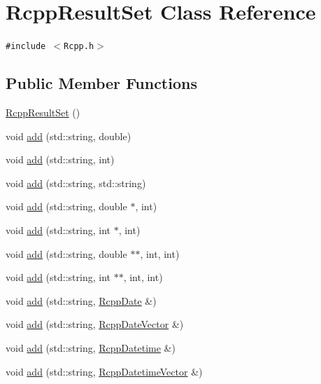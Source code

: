 \hypertarget{classRcppResultSet}{
\section{RcppResultSet Class Reference}
\label{classRcppResultSet}
}
{\tt \#include $<$Rcpp.h$>$}

\subsection*{Public Member Functions}
\begin{CompactItemize}
\item 
\hyperlink{classRcppResultSet_b799c6b9bd730e55d92228203903ba74}{RcppResultSet} ()
\item 
void \hyperlink{classRcppResultSet_7c7da37f18bd352303bf06b7c5233bc4}{add} (std::string, double)
\item 
void \hyperlink{classRcppResultSet_8b7841ff8a52477b0c6a1fb7c03c0fd9}{add} (std::string, int)
\item 
void \hyperlink{classRcppResultSet_2633372ab2f50b269e9e26dd7a489492}{add} (std::string, std::string)
\item 
void \hyperlink{classRcppResultSet_5d06d8a4f0497abc6fad4ea22b4934f9}{add} (std::string, double $\ast$, int)
\item 
void \hyperlink{classRcppResultSet_494dbe1f6db48bf48e9e33a32d897f29}{add} (std::string, int $\ast$, int)
\item 
void \hyperlink{classRcppResultSet_88ff0e3db486eec0012eb58beee05e9b}{add} (std::string, double $\ast$$\ast$, int, int)
\item 
void \hyperlink{classRcppResultSet_2cca9ea4e9554c4fad9bc326355c354c}{add} (std::string, int $\ast$$\ast$, int, int)
\item 
void \hyperlink{classRcppResultSet_e5cb861a0d6e95cc7ed465ccae2ac4a7}{add} (std::string, \hyperlink{classRcppDate}{RcppDate} \&)
\item 
void \hyperlink{classRcppResultSet_d7efd746596959ce68ca98c690a2f645}{add} (std::string, \hyperlink{classRcppDateVector}{RcppDateVector} \&)
\item 
void \hyperlink{classRcppResultSet_1d921e7a24e50369ae67a1bc63826131}{add} (std::string, \hyperlink{classRcppDatetime}{RcppDatetime} \&)
\item 
void \hyperlink{classRcppResultSet_ac8cade970247a377e8dbebf1c79a86c}{add} (std::string, \hyperlink{classRcppDatetimeVector}{RcppDatetimeVector} \&)
\item 

\end{CompactItemize}
